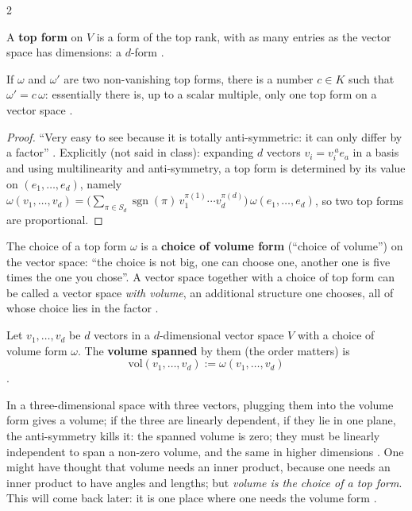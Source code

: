 \begin{paracol}{2}
\begin{definition}\label{def:te-top}
A \textbf{top form} on $V$ is a form of the top rank, with as many entries as the vector space has dimensions: a $d$-form .
\end{definition}
\begin{proposition}\label{prop:te-topuniq}
If $\omega$ and $\omega'$ are two non-vanishing top forms, there is a number $c\in K$ such that $\omega'=c\,\omega$: essentially there is, up to a scalar multiple, only one top form on a vector space .
\end{proposition}
\begin{proof}
``Very easy to see because it is totally anti-symmetric: it can only differ by a factor'' . Explicitly (not said in class): expanding $d$ vectors $v_i=v_i^{\,a}e_a$ in a basis and using multilinearity and anti-symmetry, a top form is determined by its value on $(e_1,\dots,e_d)$, namely
$\omega(v_1,\dots,v_d)=\bigl(\sum_{\pi\in S_d}\operatorname{sgn}(\pi)\,v_1^{\pi(1)}\cdots v_d^{\pi(d)}\bigr)\,\omega(e_1,\dots,e_d)$, so two top forms are proportional.
\end{proof}
The choice of a top form $\omega$ is a \textbf{choice of volume form} (``choice of volume'') on the vector space: ``the choice is not big, one can choose one, another one is five times the one you chose''. A vector space together with a choice of top form can be called a vector space \emph{with volume}, an additional structure one chooses, all of whose choice lies in the factor
.
\begin{definition}\label{def:te-vol}
Let $v_1,\dots,v_d$ be $d$ vectors in a $d$-dimensional vector space $V$ with a choice of volume form $\omega$. The \textbf{volume spanned} by them (the order matters) is
\[
  \mathrm{vol}(v_1,\dots,v_d):=\omega(v_1,\dots,v_d)
\]
.
\end{definition}
In a three-dimensional space with three vectors, plugging them into the volume form gives a volume; if the three are linearly dependent, if they lie in one plane, the anti-symmetry kills it: the spanned volume is zero; they must be linearly independent to span a non-zero volume, and the same in higher dimensions .
One might have thought that volume needs an inner product, because one needs an inner product to have angles and lengths; but \emph{volume is the choice of a top form}. This will come back later: it is one place where one needs the volume form .


\end{paracol}
